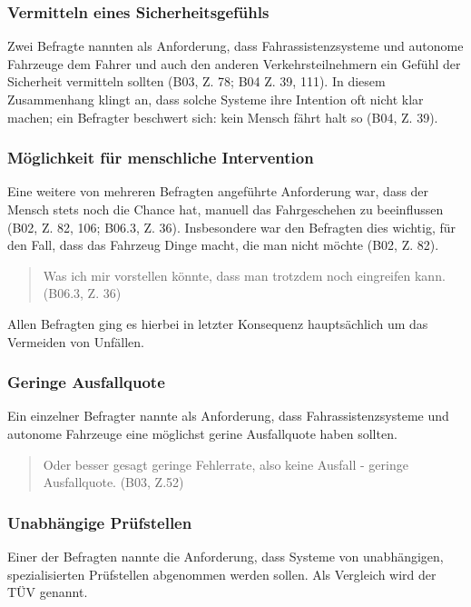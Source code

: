 \documentclass[12pt]{article}
\begin{document}
\subsubsection*{Vermitteln eines Sicherheitsgefühls}
Zwei Befragte nannten als Anforderung, dass Fahrassistenzsysteme und autonome Fahrzeuge dem Fahrer und auch den anderen Verkehrsteilnehmern ein Gefühl der Sicherheit vermitteln sollten (B03, Z. 78; B04 Z. 39, 111). In diesem Zusammenhang klingt an, dass solche Systeme ihre Intention oft nicht klar machen; ein Befragter beschwert sich: \glqq kein Mensch fährt halt so\grqq{} (B04, Z. 39).

\subsubsection*{Möglichkeit für menschliche Intervention}
Eine weitere von mehreren Befragten angeführte Anforderung war, dass der Mensch stets noch die Chance hat, manuell das Fahrgeschehen zu beeinflussen (B02, Z. 82, 106; B06.3, Z. 36). Insbesondere war den Befragten dies wichtig, für den Fall, dass \glqq das Fahrzeug Dinge macht, die man nicht möchte\grqq{} (B02, Z. 82).

\begin{quote}
  Was ich mir vorstellen könnte, dass man trotzdem noch eingreifen kann. (B06.3, Z. 36)
\end{quote}

Allen Befragten ging es hierbei in letzter Konsequenz hauptsächlich um das Vermeiden von Unfällen.

\subsubsection*{Geringe Ausfallquote}
Ein einzelner Befragter nannte als Anforderung, dass Fahrassistenzsysteme und autonome Fahrzeuge eine möglichst gerine Ausfallquote haben sollten.

\begin{quote}
  Oder besser gesagt geringe Fehlerrate, also keine Ausfall - geringe Ausfallquote. (B03, Z.52)
\end{quote}

\subsubsection*{Unabhängige Prüfstellen}
Einer der Befragten nannte die Anforderung, dass Systeme von unabhängigen, spezialisierten Prüfstellen abgenommen werden sollen. Als Vergleich wird der TÜV genannt.
\end{document}
